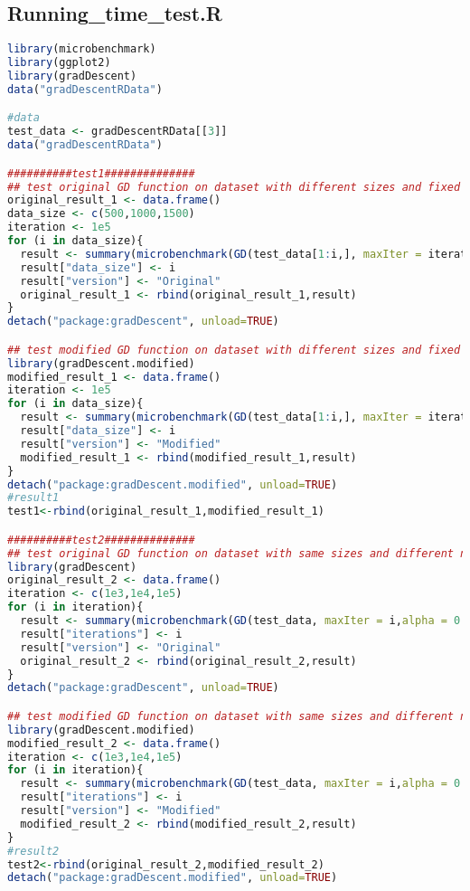 \documentclass[12pt, letterpaper]{article} %
\begin{document}
\subsection*{Running\_time\_test.R}
\begin{lstlisting}[language=r,basicstyle=\regular]
library(microbenchmark)
library(ggplot2)
library(gradDescent)
data("gradDescentRData")

#data
test_data <- gradDescentRData[[3]]
data("gradDescentRData")

##########test1##############
## test original GD function on dataset with different sizes and fixed number of iteration
original_result_1 <- data.frame()
data_size <- c(500,1000,1500)
iteration <- 1e5
for (i in data_size){
  result <- summary(microbenchmark(GD(test_data[1:i,], maxIter = iteration,alpha = 0.0001),times =1,unit= "s"))
  result["data_size"] <- i
  result["version"] <- "Original"
  original_result_1 <- rbind(original_result_1,result)
}
detach("package:gradDescent", unload=TRUE)

## test modified GD function on dataset with different sizes and fixed number of iteration for run of GD
library(gradDescent.modified)
modified_result_1 <- data.frame()
iteration <- 1e5
for (i in data_size){
  result <- summary(microbenchmark(GD(test_data[1:i,], maxIter = iteration,alpha = 0.0001),times =1,unit= "s"))
  result["data_size"] <- i
  result["version"] <- "Modified"
  modified_result_1 <- rbind(modified_result_1,result)
}
detach("package:gradDescent.modified", unload=TRUE)
#result1
test1<-rbind(original_result_1,modified_result_1)

##########test2##############
## test original GD function on dataset with same sizes and different number of iteration
library(gradDescent)
original_result_2 <- data.frame()
iteration <- c(1e3,1e4,1e5)
for (i in iteration){
  result <- summary(microbenchmark(GD(test_data, maxIter = i,alpha = 0.0001),times =1,unit= "s"))
  result["iterations"] <- i
  result["version"] <- "Original"
  original_result_2 <- rbind(original_result_2,result)
}
detach("package:gradDescent", unload=TRUE)

## test modified GD function on dataset with same sizes and different number of iteration
library(gradDescent.modified)
modified_result_2 <- data.frame()
iteration <- c(1e3,1e4,1e5)
for (i in iteration){
  result <- summary(microbenchmark(GD(test_data, maxIter = i,alpha = 0.0001),times =10,unit= "s"))
  result["iterations"] <- i
  result["version"] <- "Modified"
  modified_result_2 <- rbind(modified_result_2,result)
}
#result2
test2<-rbind(original_result_2,modified_result_2)
detach("package:gradDescent.modified", unload=TRUE)
\end{lstlisting}
\end{document}
